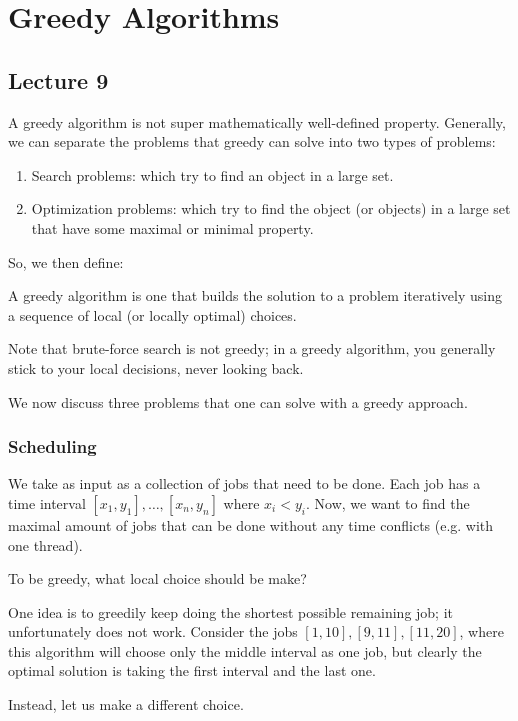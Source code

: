 \section{Greedy Algorithms}
\subsection{Lecture 9}

A greedy algorithm is not super mathematically well-defined property. Generally,
we can separate the problems that greedy can solve into two types of problems:
\begin{enumerate}
    \item Search problems: which try to find an object in a large set.
    \item Optimization problems: which try to find the object (or objects) in a large set that have some maximal or minimal property.
\end{enumerate}
So, we then define:
\begin{definition} 
    A greedy algorithm is one that builds the solution to a problem iteratively using a sequence of local (or locally optimal) choices.
\end{definition}
Note that brute-force search is not greedy; in a greedy algorithm, you generally stick to your local decisions, never looking back.

We now discuss three problems that one can solve with a greedy approach.

\subsubsection{Scheduling}
We take as input as a collection of jobs that need to be done. Each job has a time interval $[x_1, y_1], \dots, [x_n, y_n]$ where $x_i < y_i$.
Now, we want to find the maximal amount of jobs that can be done without any time conflicts (e.g. with one thread).

To be greedy, what local choice should be make? 

One idea is to greedily keep doing the shortest possible remaining job; it unfortunately does not work. Consider the jobs $[1, 10], [9, 11], [11, 20]$, where
this algorithm will choose only the middle interval as one job, but clearly the optimal solution is taking the first interval and the last one.

Instead, let us make a different choice.

